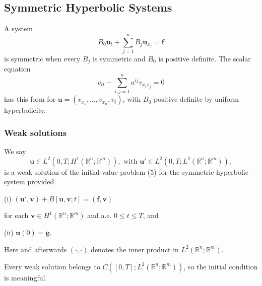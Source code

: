 \subsection{Symmetric Hyperbolic Systems}

\begin{remark}
\label{rem:symmetric-hyperbolic-general-systems}

A system
\[
B_0\mathbf u_t+\sum_{j=1}^nB_j\mathbf u_{x_j}=\mathbf f
\tag{9}
\]
is symmetric when every $B_j$ is symmetric and $B_0$ is positive definite. The scalar equation
\[
v_{tt}-\sum_{i,j=1}^na^{ij}v_{x_ix_j}=0
\tag{10}
\]
has this form for $\mathbf u=(v_{x_1},\ldots,v_{x_n},v_t)$, with $B_0$ positive definite by uniform hyperbolicity.
\end{remark}

\subsubsection{Weak solutions}

\begin{definition}
\label{def:weak-solution-symmetric-hyperbolic-system}

We say
\[
\mathbf{u} \in L^2(0,T; H^1(\mathbb{R}^n; \mathbb{R}^m)), \text{ with } \mathbf{u}' \in L^2(0,T; L^2(\mathbb{R}^n; \mathbb{R}^m)),
\]
is a weak solution of the initial-value problem (5) for the symmetric hyperbolic system provided

(i) $(\mathbf{u}',\mathbf{v}) + B[\mathbf{u},\mathbf{v};t] = (\mathbf{f},\mathbf{v})$

for each $\mathbf{v} \in H^1(\mathbb{R}^n; \mathbb{R}^m)$ and a.e. $0 \le t \le T$, and

(ii) $\mathbf{u}(0) = \mathbf{g}$.

Here and afterwards $(\cdot, \cdot)$ denotes the inner product in $L^2(\mathbb{R}^n; \mathbb{R}^m)$.
\end{definition}

\begin{remark}
\label{rem:weak-solution-symmetric-hyperbolic-continuity}

Every weak solution belongs to $C([0,T];L^2(\mathbb R^n;\mathbb R^m))$, so the initial condition is meaningful.
\end{remark}

